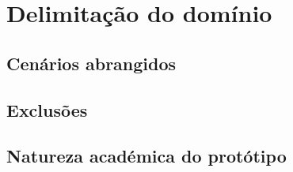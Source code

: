 \chapter{Delimitação do domínio}
\label{cap:delimitacao}

\section{Cenários abrangidos}


\section{Exclusões}


\section{Natureza académica do protótipo}


